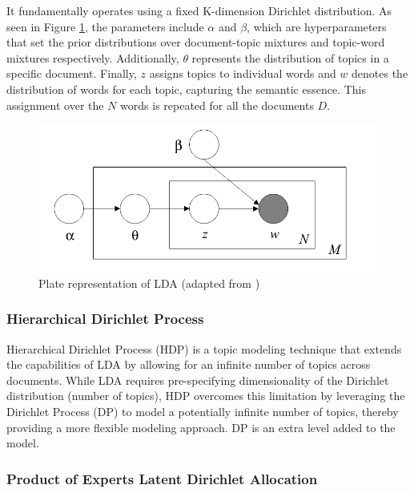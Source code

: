It fundamentally operates using a fixed K-dimension Dirichlet distribution. As seen in Figure \ref{fig:LDA_Plate}, the parameters include $\alpha$ and $\beta$, which are hyperparameters that set the prior distributions over document-topic mixtures and topic-word mixtures respectively. Additionally, $\theta$ represents the distribution of topics in a specific document. Finally, $z$ assigns topics to individual words and $w$ denotes the distribution of words for each topic, capturing the semantic essence. This assignment over the $N$ words is repeated for all the documents $D$.

\begin{figure}[H]
\centering
\includegraphics[width=0.5\columnwidth]{figs/lda_plate.png}
\caption[Latent Dirichlet Allocation Plate]{Plate representation of LDA
(adapted from \cite{Blei;Ng;Jordan:03})}
\label{fig:LDA_Plate}
\end{figure}

\subsubsection{Hierarchical Dirichlet Process} 

Hierarchical Dirichlet Process (HDP) \citep{Teh;Jordan;Beal;Blei:06} is a topic modeling technique that extends the capabilities of LDA by allowing for an infinite number of topics across documents. While LDA requires pre-specifying dimensionality of the Dirichlet distribution (number of topics), HDP overcomes this limitation by leveraging the Dirichlet Process (DP) to model a potentially infinite number of topics, thereby providing a more flexible modeling approach. DP is an extra level added to the model.

\subsubsection{Product of Experts Latent Dirichlet Allocation}

